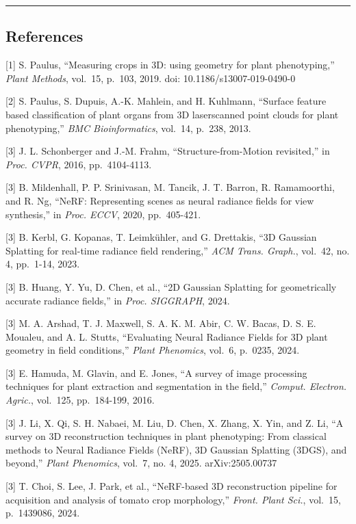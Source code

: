 \documentclass[11pt,a4paper]{article}
\begin{document}
\begin{center}\rule{0.5\linewidth}{0.5pt}\end{center}

\subsection{References}\label{references}

{[}1{]} S. Paulus, ``Measuring crops in 3D: using geometry for plant
phenotyping,'' \emph{Plant Methods}, vol.~15, p.~103, 2019. doi:
10.1186/s13007-019-0490-0

{[}2{]} S. Paulus, S. Dupuis, A.-K. Mahlein, and H. Kuhlmann, ``Surface
feature based classification of plant organs from 3D laserscanned point
clouds for plant phenotyping,'' \emph{BMC Bioinformatics}, vol.~14,
p.~238, 2013.

{[}3{]} J. L. Schonberger and J.-M. Frahm, ``Structure-from-Motion
revisited,'' in \emph{Proc. CVPR}, 2016, pp.~4104-4113.

{[}3{]} B. Mildenhall, P. P. Srinivasan, M. Tancik, J. T. Barron, R.
Ramamoorthi, and R. Ng, ``NeRF: Representing scenes as neural radiance
fields for view synthesis,'' in \emph{Proc. ECCV}, 2020, pp.~405-421.

{[}3{]} B. Kerbl, G. Kopanas, T. Leimkühler, and G. Drettakis, ``3D
Gaussian Splatting for real-time radiance field rendering,'' \emph{ACM
Trans. Graph.}, vol.~42, no. 4, pp.~1-14, 2023.

{[}3{]} B. Huang, Y. Yu, D. Chen, et al., ``2D Gaussian Splatting for
geometrically accurate radiance fields,'' in \emph{Proc. SIGGRAPH},
2024.

{[}3{]} M. A. Arshad, T. J. Maxwell, S. A. K. M. Abir, C. W. Bacas, D.
S. E. Moualeu, and A. L. Stutts, ``Evaluating Neural Radiance Fields for
3D plant geometry in field conditions,'' \emph{Plant Phenomics}, vol.~6,
p.~0235, 2024.

{[}3{]} E. Hamuda, M. Glavin, and E. Jones, ``A survey of image
processing techniques for plant extraction and segmentation in the
field,'' \emph{Comput. Electron. Agric.}, vol.~125, pp.~184-199, 2016.

{[}3{]} J. Li, X. Qi, S. H. Nabaei, M. Liu, D. Chen, X. Zhang, X. Yin,
and Z. Li, ``A survey on 3D reconstruction techniques in plant
phenotyping: From classical methods to Neural Radiance Fields (NeRF), 3D
Gaussian Splatting (3DGS), and beyond,'' \emph{Plant Phenomics}, vol.~7,
no. 4, 2025. arXiv:2505.00737

{[}3{]} T. Choi, S. Lee, J. Park, et al., ``NeRF-based 3D reconstruction
pipeline for acquisition and analysis of tomato crop morphology,''
\emph{Front. Plant Sci.}, vol.~15, p.~1439086, 2024.
\end{document}
